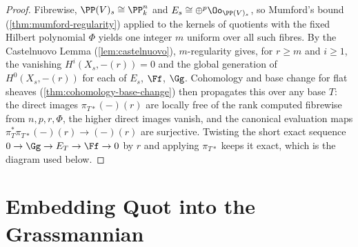 \begin{proof}
  Fibrewise, $\PP(V)_s \cong \PP^n_k$ and $E_s \cong \oplus^p \Oo_{\PP(V)_s}$,
  so Mumford's bound (\cref{thm:mumford-regularity}) applied to the kernels of
  quotients with the fixed Hilbert polynomial $\Phi$ yields one integer $m$
  uniform over all such fibres. By the Castelnuovo Lemma
  (\cref{lem:castelnuovo}), $m$-regularity gives, for $r \ge m$ and $i \ge 1$,
  the vanishing $H^i(X_s, -(r)) = 0$ and the global generation of
  $H^0(X_s, -(r))$ for each of $E_s$, $\Ff$, $\Gg$. Cohomology and base change
  for flat sheaves (\cref{thm:cohomology-base-change}) then propagates this over
  any base $T$: the direct images $\pi_{T*}(-)(r)$ are locally free of the rank
  computed fibrewise from $n, p, r, \Phi$, the higher direct images vanish, and
  the canonical evaluation maps $\pi_T^*\pi_{T*}(-)(r) \to (-)(r)$ are
  surjective. Twisting the short exact sequence
  $0 \to \Gg \to E_T \to \Ff \to 0$ by $r$ and applying $\pi_{T*}$ keeps it
  exact, which is the diagram used below.
\end{proof}

\bigskip
\section*{Embedding Quot into the Grassmannian}
\medskip


